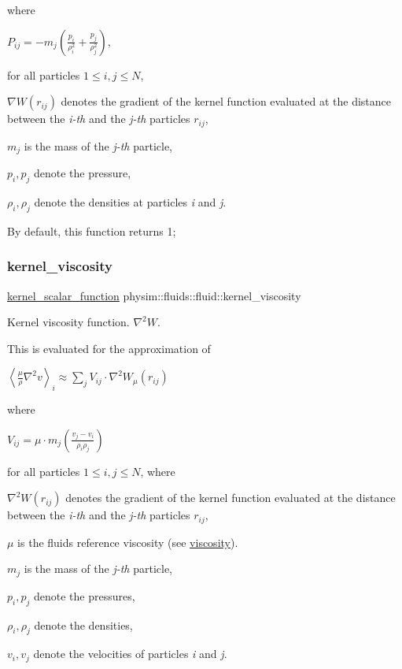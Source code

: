 where

$ P_{ij} = -m_j \left( \frac{p_i}{\rho_i^2} + \frac{p_j}{\rho_j^2} \right) $,

for all particles $1 \le i,j \le N$,
\begin{DoxyItemize}
\item $\nabla W(r_{ij})$ denotes the gradient of the kernel function evaluated at the distance between the {\itshape i-\/th} and the {\itshape j-\/th} particles $r_{ij}$,
\item $m_j$ is the mass of the {\itshape j-\/th} particle,
\item $p_i, p_j$ denote the pressure,
\item $\rho_i, \rho_j$ denote the densities at particles {\itshape i} and {\itshape j}.
\end{DoxyItemize}

By default, this function returns 1; \mbox{\label{classphysim_1_1fluids_1_1fluid_a5ba8b8fc47ed8c45c279aebf5d62899d}} 
\subsubsection{\texorpdfstring{kernel\+\_\+viscosity}{kernel\_viscosity}}
{\footnotesize\ttfamily \hyperlink{namespacephysim_1_1fluids_a22c55c76ab3fe3de79dada15e2f9c2d6}{kernel\+\_\+scalar\+\_\+function} physim\+::fluids\+::fluid\+::kernel\+\_\+viscosity\hspace{0.3cm}{\ttfamily [protected]}}



Kernel viscosity function. $\nabla^2 W$. 

This is evaluated for the approximation of

$ \left\langle \frac{\mu}{\rho}\nabla^2 v\right\rangle_i \approx \sum_j V_{ij} \cdot \nabla^2 W_\mu(r_{ij}) $

where

$ V_{ij} = \mu \cdot m_j \left( \frac{v_j - v_i}{\rho_i \rho_j} \right) $

for all particles $1 \le i,j \le N$, where
\begin{DoxyItemize}
\item $\nabla^2 W(r_{ij})$ denotes the gradient of the kernel function evaluated at the distance between the {\itshape i-\/th} and the {\itshape j-\/th} particles $r_{ij}$,
\item $\mu$ is the fluid\textquotesingle{}s reference viscosity (see \hyperlink{classphysim_1_1fluids_1_1fluid_ad5c3e98b6aac62058af8defcb20a2678}{viscosity}).
\item $m_j$ is the mass of the {\itshape j-\/th} particle,
\item $p_i, p_j$ denote the pressures,
\item $\rho_i, \rho_j$ denote the densities,
\item $v_i, v_j$ denote the velocities of particles {\itshape i} and {\itshape j}.
\end{DoxyItemize}

